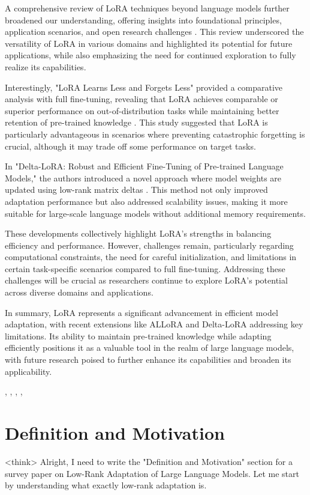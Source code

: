 \documentclass[conference]{IEEEtran}
\begin{document}
A comprehensive review of LoRA techniques beyond language models further broadened our understanding, offering insights into foundational principles, application scenarios, and open research challenges \cite{b3}. This review underscored the versatility of LoRA in various domains and highlighted its potential for future applications, while also emphasizing the need for continued exploration to fully realize its capabilities.

Interestingly, "LoRA Learns Less and Forgets Less" provided a comparative analysis with full fine-tuning, revealing that LoRA achieves comparable or superior performance on out-of-distribution tasks while maintaining better retention of pre-trained knowledge \cite{b4}. This study suggested that LoRA is particularly advantageous in scenarios where preventing catastrophic forgetting is crucial, although it may trade off some performance on target tasks.

In "Delta-LoRA: Robust and Efficient Fine-Tuning of Pre-trained Language Models," the authors introduced a novel approach where model weights are updated using low-rank matrix deltas \cite{b5}. This method not only improved adaptation performance but also addressed scalability issues, making it more suitable for large-scale language models without additional memory requirements.

These developments collectively highlight LoRA's strengths in balancing efficiency and performance. However, challenges remain, particularly regarding computational constraints, the need for careful initialization, and limitations in certain task-specific scenarios compared to full fine-tuning. Addressing these challenges will be crucial as researchers continue to explore LoRA's potential across diverse domains and applications.

In summary, LoRA represents a significant advancement in efficient model adaptation, with recent extensions like ALLoRA and Delta-LoRA addressing key limitations. Its ability to maintain pre-trained knowledge while adapting efficiently positions it as a valuable tool in the realm of large language models, with future research poised to further enhance its capabilities and broaden its applicability.

\cite{b1}, \cite{b2}, \cite{b3}, \cite{b4}, \cite{b5}

\section{Definition and Motivation}
<think>
Alright, I need to write the "Definition and Motivation" section for a survey paper on Low-Rank Adaptation of Large Language Models. Let me start by understanding what exactly low-rank adaptation is.
\end{document}
